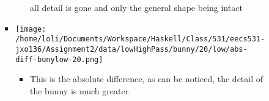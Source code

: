 \documentclass{article}
\begin{document}
\begin{enumerate}
\begin{enumerate}
\begin{itemize}
\begin{itemize}
\begin{itemize}
all detail is gone and only the general shape being intact
\end{itemize}
\item \texttt{[image: /home/loli/Documents/Workspace/Haskell/Class/531/eecs531-jxo136/Assignment2/data/lowHighPass/bunny/20/low/abs-diff-bunylow-20.png]}
\begin{itemize}
\item This is the absolute difference, as can be noticed, the detail
of the bunny is much greater.
\end{itemize}
\end{itemize}
\end{itemize}
\end{enumerate}
\end{enumerate}
\end{document}
